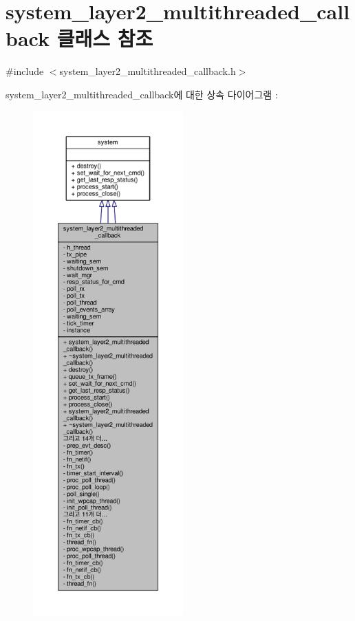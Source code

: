 \hypertarget{classavdecc__lib_1_1system__layer2__multithreaded__callback}{}\section{system\+\_\+layer2\+\_\+multithreaded\+\_\+callback 클래스 참조}
\label{classavdecc__lib_1_1system__layer2__multithreaded__callback}


{\ttfamily \#include $<$system\+\_\+layer2\+\_\+multithreaded\+\_\+callback.\+h$>$}



system\+\_\+layer2\+\_\+multithreaded\+\_\+callback에 대한 상속 다이어그램 \+: 
\nopagebreak
\begin{figure}[H]
\begin{center}
\leavevmode
\includegraphics[height=550pt]{classavdecc__lib_1_1system__layer2__multithreaded__callback__inherit__graph}
\end{center}
\end{figure}


